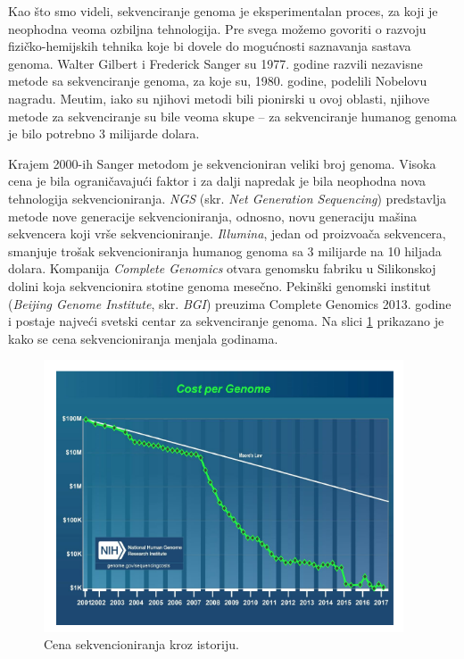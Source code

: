 Kao \v sto smo videli, sekvenciranje genoma je eksperimentalan proces, za koji je neophodna veoma ozbiljna tehnologija. Pre svega mo\v zemo govoriti o razvoju fizi\v cko-hemijskih tehnika koje bi dovele do mogu\'cnosti saznavanja sastava genoma. Walter Gilbert i Frederick Sanger su 1977. godine razvili nezavisne metode sa sekvenciranje genoma, za koje su, 1980. godine, podelili Nobelovu nagradu. Me\dj utim, iako su njihovi metodi bili pionirski u ovoj oblasti, njihove metode za sekvenciranje su bile veoma skupe -- za sekvenciranje humanog genoma je bilo potrebno 3 milijarde dolara.

Krajem 2000-ih Sanger metodom je sekvencioniran veliki broj genoma. Visoka cena je bila ograničavajući faktor i za dalji napredak je bila neophodna nova tehnologija sekvencioniranja. \emph{NGS} (skr. \emph{Net Generation Sequencing}) predstavlja metode nove generacije sekvencioniranja, odnosno, novu generaciju ma\v sina sekvencera koji vr\v se sekvencioniranje. \emph{Illumina}, jedan od proizvo\dj a\v ca sekvencera, smanjuje trošak sekvencioniranja humanog genoma sa 3 milijarde na 10 hiljada dolara. Kompanija \emph{Complete Genomics} otvara genomsku fabriku u Silikonskoj dolini koja sekvencionira stotine genoma mesečno. Pekinški genomski institut (\emph{Beijing Genome Institute}, skr. \emph{BGI}) preuzima Complete Genomics 2013. godine i postaje najveći svetski centar za sekvenciranje genoma. Na slici \ref{slika:cena} prikazano je kako se cena sekvencioniranja menjala godinama.

\begin{figure}[h]
	\centering
	\includegraphics[width=0.95\textwidth]{poglavlja/3/slike/cena_sekvencioniranja.png}
	\caption{Cena sekvencioniranja kroz istoriju.}
	\label{slika:cena}
\end{figure} 


